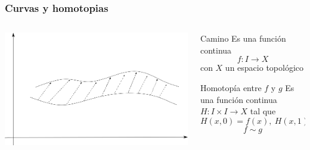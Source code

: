 \documentclass[xetex,mathserif,serif]{beamer}
\begin{document}
  \begin{frame}
    \frametitle{Curvas y homotopias}
    \begin{columns}

      \begin{column}{.5\textwidth}
        \begin{center}
          \includegraphics[scale=0.3]{../tesis/imagenes/homotopia.png}
        \end{center}
      \end{column}

      \pause

      \begin{column}{.5\textwidth}
        \begin{block}{Camino}
          Es una función continua \[ f : I \to X \] con \(X\) un espacio
          topológico
        \end{block}

        \pause

        \begin{block}{Homotopía entre \(f\) y \(g\)}
          Es una función continua \(H : I \times I \to X\) tal que
          \[ H(x,0) = f(x),\ H(x,1) = g(x) \]
          \[ f \sim g \]
        \end{block}
      \end{column}
    \end{columns}
  \end{frame}
\end{document}
